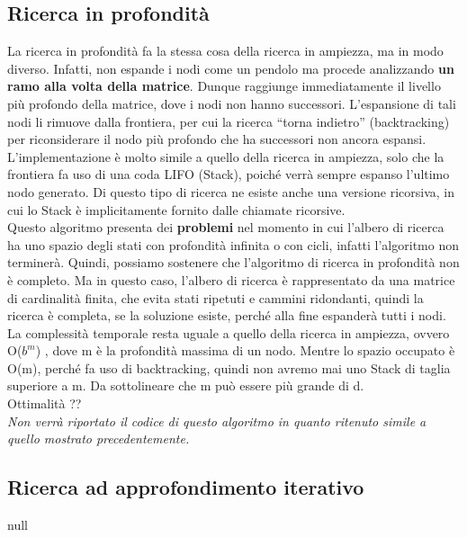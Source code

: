 \documentclass[10pt,a4paper]{article}
\begin{document}
	\subsection{Ricerca in profondità}
	La ricerca in profondità fa la stessa cosa della ricerca in ampiezza, ma in modo diverso. Infatti, non espande i nodi come un pendolo ma procede analizzando \textbf{un ramo alla volta della matrice}. Dunque raggiunge immediatamente il livello più profondo della matrice, dove i nodi non hanno successori. L’espansione di tali nodi li rimuove dalla frontiera, per cui la ricerca “torna indietro” (backtracking) per riconsiderare il nodo più profondo che ha successori non ancora espansi. L'implementazione è molto simile a quello della ricerca in ampiezza, solo che la frontiera fa uso di una coda LIFO (Stack), poiché verrà sempre espanso l’ultimo nodo generato. Di questo tipo di ricerca ne esiste anche una versione ricorsiva, in cui lo Stack è implicitamente fornito dalle chiamate ricorsive.\\
	Questo algoritmo presenta dei \textbf{problemi} nel momento in cui l’albero di ricerca ha uno spazio degli stati con profondità infinita o con cicli, infatti l’algoritmo non terminerà. Quindi, possiamo sostenere che l’algoritmo di ricerca in profondità non è completo.
	Ma in questo caso, l'albero di ricerca è rappresentato da una matrice di cardinalità finita, che evita stati ripetuti e cammini ridondanti, quindi la ricerca è completa, se la soluzione esiste, perché alla fine espanderà tutti i nodi.\\
	La complessità temporale resta uguale a quello della ricerca in ampiezza, ovvero O($b^m$) , dove m è la profondità massima di un nodo. Mentre lo spazio occupato è O(m), perché fa uso di backtracking, quindi non avremo mai uno Stack di taglia superiore a m. Da sottolineare che m può essere più grande di d.\\
	Ottimalità ?? \\
	\textit{Non verrà riportato il codice di questo algoritmo in quanto ritenuto simile a quello mostrato precedentemente.}\\
	\subsection{Ricerca ad approfondimento iterativo}
	null
	\newpage
\end{document}
